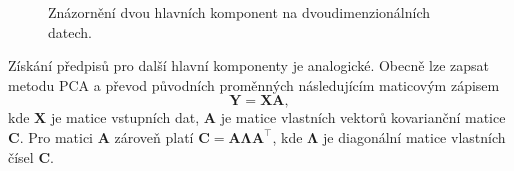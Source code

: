 \begin{figure}[hbtp!]
    \centering
    \caption{Znázornění dvou hlavních komponent na dvoudimenzionálních datech.}
    \label{obr:met:PCA1}
\end{figure}


Získání předpisů pro další hlavní komponenty je analogické. Obecně lze zapsat metodu PCA a převod původních proměnných následujícím maticovým zápisem
\begin{equation}
    \mathbf{Y} = \mathbf{XA}, 
\end{equation}
kde $\mathbf{X}$ je matice vstupních dat, $\mathbf{A}$ je matice vlastních vektorů kovarianční matice $\mathbf{C}$. Pro matici $\mathbf{A}$ zároveň platí $\mathbf{C} =  \mathbf{A} \mathbf{\Lambda} \mathbf{A}^\top$, kde $\mathbf{\Lambda}$ je diagonální matice vlastních čísel $\mathbf{C}$.\cite{bib:PCA2}  %
